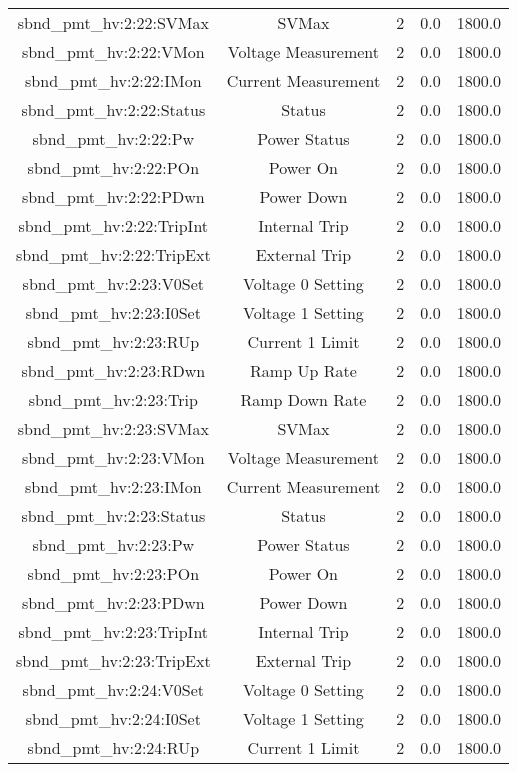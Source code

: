 \begin{table}[ptb]
\begin{tabular}{c | c c c c}
sbnd_pmt_hv:2:22:SVMax & SVMax & 2 & 0.0 & 1800.0\\ 
sbnd_pmt_hv:2:22:VMon & Voltage Measurement & 2 & 0.0 & 1800.0\\ 
sbnd_pmt_hv:2:22:IMon & Current Measurement & 2 & 0.0 & 1800.0\\ 
sbnd_pmt_hv:2:22:Status & Status & 2 & 0.0 & 1800.0\\ 
sbnd_pmt_hv:2:22:Pw & Power Status & 2 & 0.0 & 1800.0\\ 
sbnd_pmt_hv:2:22:POn & Power On & 2 & 0.0 & 1800.0\\ 
sbnd_pmt_hv:2:22:PDwn & Power Down & 2 & 0.0 & 1800.0\\ 
sbnd_pmt_hv:2:22:TripInt & Internal Trip & 2 & 0.0 & 1800.0\\ 
sbnd_pmt_hv:2:22:TripExt & External Trip & 2 & 0.0 & 1800.0\\ 
sbnd_pmt_hv:2:23:V0Set & Voltage 0 Setting & 2 & 0.0 & 1800.0\\ 
sbnd_pmt_hv:2:23:I0Set & Voltage 1 Setting & 2 & 0.0 & 1800.0\\ 
sbnd_pmt_hv:2:23:RUp & Current 1 Limit & 2 & 0.0 & 1800.0\\ 
sbnd_pmt_hv:2:23:RDwn & Ramp Up Rate & 2 & 0.0 & 1800.0\\ 
sbnd_pmt_hv:2:23:Trip & Ramp Down Rate & 2 & 0.0 & 1800.0\\ 
sbnd_pmt_hv:2:23:SVMax & SVMax & 2 & 0.0 & 1800.0\\ 
sbnd_pmt_hv:2:23:VMon & Voltage Measurement & 2 & 0.0 & 1800.0\\ 
sbnd_pmt_hv:2:23:IMon & Current Measurement & 2 & 0.0 & 1800.0\\ 
sbnd_pmt_hv:2:23:Status & Status & 2 & 0.0 & 1800.0\\ 
sbnd_pmt_hv:2:23:Pw & Power Status & 2 & 0.0 & 1800.0\\ 
sbnd_pmt_hv:2:23:POn & Power On & 2 & 0.0 & 1800.0\\ 
sbnd_pmt_hv:2:23:PDwn & Power Down & 2 & 0.0 & 1800.0\\ 
sbnd_pmt_hv:2:23:TripInt & Internal Trip & 2 & 0.0 & 1800.0\\ 
sbnd_pmt_hv:2:23:TripExt & External Trip & 2 & 0.0 & 1800.0\\ 
sbnd_pmt_hv:2:24:V0Set & Voltage 0 Setting & 2 & 0.0 & 1800.0\\ 
sbnd_pmt_hv:2:24:I0Set & Voltage 1 Setting & 2 & 0.0 & 1800.0\\ 
sbnd_pmt_hv:2:24:RUp & Current 1 Limit & 2 & 0.0 & 1800.0\\ 

\end{tabular}
\end{table}
